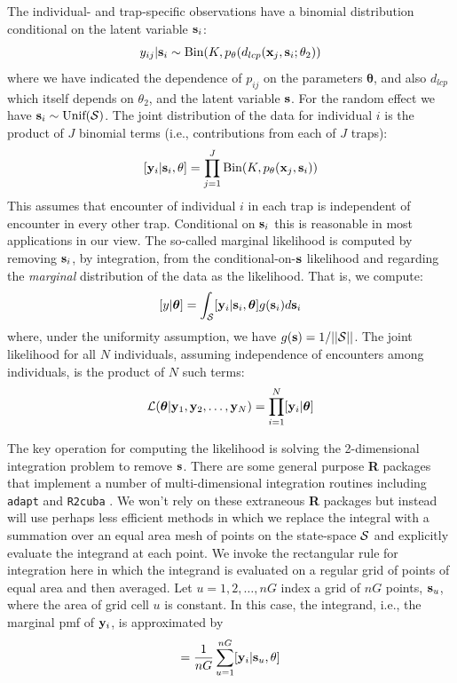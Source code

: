 \documentclass[12pt]{article}
\begin{document}
The individual- and trap-specific observations have a binomial
distribution conditional on the latent variable ${\bf s}_{i}$:
\begin{equation}
	y_{ij}| {\bf s}_{i} \sim \mbox{Bin}(K, p_{\theta}(d_{lcp}({\bf x}_{j},{\bf s}_{i};\theta_{2}))
\label{mle.eq.cond-on-s}
\end{equation}
where we have indicated the dependence of $p_{ij}$ on the parameters
${\bm \theta}$, and also $d_{lcp}$ which
itself depends on $\theta_{2}$, and the latent variable ${\bf s}$.
For the random effect we have ${\bf s}_{i} \sim  \mbox{Unif}({\cal
  S})$.
The joint distribution of the data for individual $i$ is the product
of $J$ binomial terms (i.e., contributions from each of $J$ traps):
\[
  [{\bf y}_{i} | {\bf s}_{i} , \theta] =
  \prod_{j=1}^{J} \mbox{Bin}(K, p_{\theta}({\bf x}_{j},{\bf s}_{i}) )
\]
This assumes that encounter of individual $i$ in each
trap is independent of encounter in every other trap. Conditional on
${\bf s}_{i}$ this is reasonable in most applications in our view.
 The so-called marginal likelihood is computed by removing
${\bf s}_{i}$, by integration,  from the conditional-on-${\bf s}$
likelihood and regarding the {\it marginal} distribution of the data
as the likelihood. That
is, we compute:
\[
  [y|{\bm \theta}] =
\int_{{\cal S}}  [ {\bf y}_{i} |{\bf s}_{i},{\bm \theta}] g({\bf s}_{i}) d{\bf s}_{i}
\]
where, under the uniformity assumption, we have
$g({\bf s}) = 1/||{\cal S}||$.
The joint likelihood for all $N$ individuals, assuming independence of
encounters among individuals, is the product of $N$ such terms:
\[
{\cal L}({\bm \theta} | {\bf y}_{1},{\bf y}_{2},\ldots, {\bf y}_{N}) = \prod_{i=1}^{N}
[{\bf y}_{i}|{\bm \theta}]
\]

The key operation for computing the likelihood is solving the
2-dimensional integration problem to remove ${\bf s}$. There are some
general purpose {\bf R} packages that implement a number of
multi-dimensional integration routines including \mbox{\tt adapt}
\citep{genz_etal:2007} and \mbox{\tt R2cuba} \citep{hahn_etal:2011}.
We won't rely on these extraneous {\bf R} packages but instead will
use perhaps less efficient methods in which we replace the integral
with a summation over an equal area mesh of points on the state-space
${\cal S}$ and explicitly evaluate the integrand at each point. We
invoke the rectangular rule for integration here in which the
integrand is evaluated on a regular grid of points of equal area and
then averaged.  Let $u=1,2,\ldots,nG$ index a grid of $nG$ points,
${\bf s}_{u}$, where the area of grid cell $u$ is constant.  In this
case, the integrand, i.e., the marginal pmf of ${\bf y}_{i}$, is
approximated by
\begin{equation}
         [{\bf y}_{i}|\theta] = \frac{1}{nG} \sum_{u=1}^{nG}  [ {\bf
            y}_{i} |{\bf s}_u, \theta]
\label{mle.eq.intlik}
\end{equation}
\end{document}
